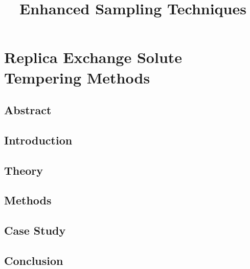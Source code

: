 \documentclass{memoir}
\title{Enhanced Sampling Techniques}
\begin{document}
\date{}

\maketitle

\tableofcontents

\chapter{Replica Exchange Solute Tempering Methods}

\section{Abstract}


\section{Introduction}

  
\section{Theory} 



\section{Methods}

%

\section{Case Study}

%

\section{Conclusion}


\end{document}
